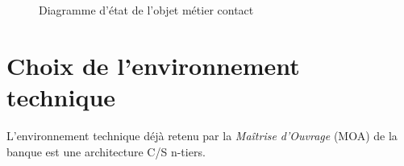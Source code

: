 \begin{figure}[H]
\noindent{}
\caption{Diagramme d'état de l'objet métier contact}
\end{figure}

\section{Choix  de  l’environnement  technique}

L’environnement technique déjà retenu par la \textit{Maîtrise d’Ouvrage} (MOA) de la banque est une architecture C/S n-tiers.
